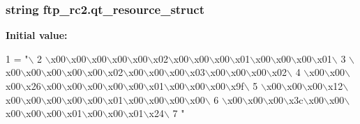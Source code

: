 \subsubsection[{qt\+\_\+resource\+\_\+struct}]{\setlength{\rightskip}{0pt plus 5cm}string ftp\+\_\+rc2.\+qt\+\_\+resource\+\_\+struct}\label{namespaceftp__rc2_af8b926d6b850f7d5d5f77c48ee02504a}
{\bfseries Initial value\+:}
\begin{DoxyCode}
1 = \textcolor{stringliteral}{"\(\backslash\)}
2 \textcolor{stringliteral}{\(\backslash\)x00\(\backslash\)x00\(\backslash\)x00\(\backslash\)x00\(\backslash\)x00\(\backslash\)x02\(\backslash\)x00\(\backslash\)x00\(\backslash\)x00\(\backslash\)x01\(\backslash\)x00\(\backslash\)x00\(\backslash\)x00\(\backslash\)x01\(\backslash\)}
3 \textcolor{stringliteral}{\(\backslash\)x00\(\backslash\)x00\(\backslash\)x00\(\backslash\)x00\(\backslash\)x00\(\backslash\)x02\(\backslash\)x00\(\backslash\)x00\(\backslash\)x00\(\backslash\)x03\(\backslash\)x00\(\backslash\)x00\(\backslash\)x00\(\backslash\)x02\(\backslash\)}
4 \textcolor{stringliteral}{\(\backslash\)x00\(\backslash\)x00\(\backslash\)x00\(\backslash\)x26\(\backslash\)x00\(\backslash\)x00\(\backslash\)x00\(\backslash\)x00\(\backslash\)x00\(\backslash\)x01\(\backslash\)x00\(\backslash\)x00\(\backslash\)x00\(\backslash\)x9f\(\backslash\)}
5 \textcolor{stringliteral}{\(\backslash\)x00\(\backslash\)x00\(\backslash\)x00\(\backslash\)x12\(\backslash\)x00\(\backslash\)x00\(\backslash\)x00\(\backslash\)x00\(\backslash\)x00\(\backslash\)x01\(\backslash\)x00\(\backslash\)x00\(\backslash\)x00\(\backslash\)x00\(\backslash\)}
6 \textcolor{stringliteral}{\(\backslash\)x00\(\backslash\)x00\(\backslash\)x00\(\backslash\)x3c\(\backslash\)x00\(\backslash\)x00\(\backslash\)x00\(\backslash\)x00\(\backslash\)x00\(\backslash\)x01\(\backslash\)x00\(\backslash\)x00\(\backslash\)x01\(\backslash\)x24\(\backslash\)}
7 \textcolor{stringliteral}{"}
\end{DoxyCode}
